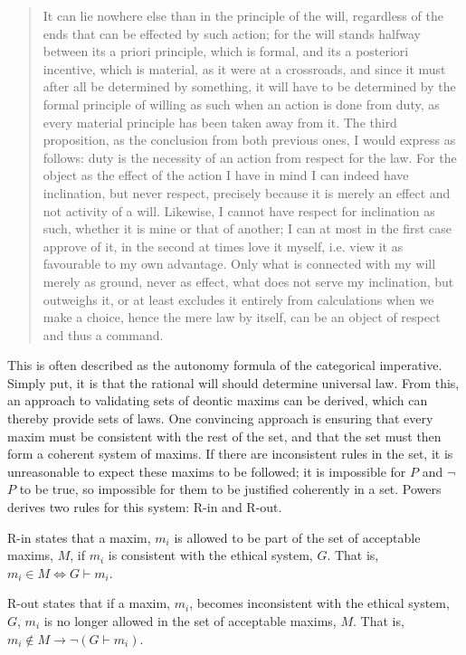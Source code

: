 \documentclass{l4proj}
\begin{document}
\blockquote{It can lie nowhere else than in the principle of the will, regardless of the ends that can be effected by such action; for the will stands halfway between its a priori principle, which is formal, and its a posteriori incentive, which is material, as it were at a crossroads, and since it must after all be determined by something, it will have to be determined by the formal principle of willing as such when an action is done from duty, as every material principle has been taken away from it. The third proposition, as the conclusion from both previous ones, I would express as follows: duty is the necessity of an action from respect for the law. For the object as the effect of the action I have in mind I can indeed have inclination, but never respect, precisely because it is merely an effect and not activity of a will. Likewise, I cannot have respect for inclination as such, whether it is mine or that of another; I can at most in the first case approve of it, in the second at times love it myself, i.e. view it as favourable to my own advantage. Only what is connected with my will merely as ground, never as effect, what does not serve my inclination, but outweighs it, or at least excludes it entirely from calculations when we make a choice, hence the mere law by itself, can be an object of respect and thus a command.}

This is often described as the autonomy formula of the categorical imperative. Simply put, it is that the rational will should determine universal law. From this, an approach to validating sets of deontic maxims can be derived, which can thereby provide sets of laws. One convincing approach is ensuring that every maxim must be consistent with the rest of the set, and that the set must then form a coherent system of maxims\cite{Powers}. If there are inconsistent rules in the set, it is unreasonable to expect these maxims to be followed; it is impossible for $P$ and \( \neg \) $P$ to be true, so impossible for them to be justified coherently in a set. Powers derives two rules for this system: R-in and R-out. 

R-in states that a maxim, $m_i$ is allowed to be part of the set of acceptable maxims, $M$, if $m_i$ is consistent with the ethical 
system, $G$. That is, $m_i \in M \iff G \vdash m_i $. 

R-out states that if a maxim, $m_i$, becomes inconsistent with the ethical system, $G$, $m_i$ is no longer allowed in the set of acceptable maxims, $M$. That is, $m_i \notin M \rightarrow \neg(G \vdash m_i)$. 
\end{document}
